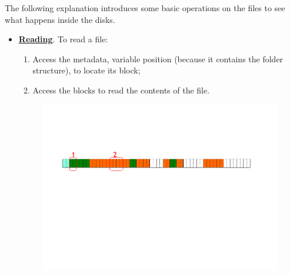 \noindent
The following explanation introduces some basic operations on the files to see what happens inside the disks.
\begin{itemize}
    \item \underline{\textbf{Reading}}. To read a file:
    \begin{enumerate}
        \item Access the metadata, variable position (because it contains the folder structure), to locate its block;
        \item Access the blocks to read the contents of the file.
    \end{enumerate}
    \begin{figure}[!htp]
        \centering
        \includegraphics[width=\textwidth]{img/files-2.pdf}
    \end{figure}


\end{itemize}
